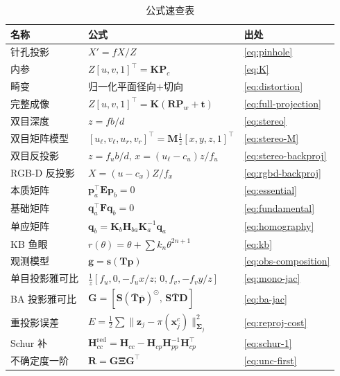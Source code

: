 \begin{table}[H]\centering\small
\caption{公式速查表}
\begin{tabular}{lll}
\toprule
名称 & 公式 & 出处 \\
\midrule
针孔投影 & $X'=fX/Z$ & \cref{eq:pinhole} \\
内参 & $Z[u,v,1]^\top=\mathbf{K}\mathbf{P}_c$ & \cref{eq:K} \\
畸变 & 归一化平面径向$+$切向 & \cref{eq:distortion} \\
完整成像 & $Z[u,v,1]^\top=\mathbf{K}(\mathbf{R}\mathbf{P}_w+\mathbf{t})$ & \cref{eq:full-projection} \\
双目深度 & $z=fb/d$ & \cref{eq:stereo} \\
双目矩阵模型 & $[u_\ell,v_\ell,u_r,v_r]^\top=\mathbf{M}\tfrac1z[x,y,z,1]^\top$ & \cref{eq:stereo-M} \\
双目反投影 & $z=f_ub/d,\,x=(u_\ell-c_u)z/f_u$ & \cref{eq:stereo-backproj} \\
RGB-D 反投影 & $X=(u-c_x)Z/f_x$ & \cref{eq:rgbd-backproj} \\
本质矩阵 & $\mathbf{p}_a^\top\mathbf{E}\mathbf{p}_b=0$ & \cref{eq:essential} \\
基础矩阵 & $\mathbf{q}_a^\top\mathbf{F}\mathbf{q}_b=0$ & \cref{eq:fundamental} \\
单应矩阵 & $\mathbf{q}_b=\mathbf{K}_b\mathbf{H}_{ba}\mathbf{K}_a^{-1}\mathbf{q}_a$ & \cref{eq:homography} \\
KB 鱼眼 & $r(\theta)=\theta+\sum k_n\theta^{2n+1}$ & \cref{eq:kb} \\
观测模型 & $\mathbf{g}=\mathbf{s}(\mathbf{T}\mathbf{p})$ & \cref{eq:obs-composition} \\
单目投影雅可比 & $\tfrac1z[f_u,0,-f_ux/z;\,0,f_v,-f_vy/z]$ & \cref{eq:mono-jac} \\
BA 投影雅可比 & $\mathbf{G}=[\mathbf{S}(\bar{\mathbf{T}}\bar{\mathbf{p}})^\odot,\,\mathbf{S}\bar{\mathbf{T}}\mathbf{D}]$ & \cref{eq:ba-jac} \\
重投影误差 & $E=\tfrac12\sum\|\mathbf{z}_j-\pi(\mathbf{x}_j^c)\|_{\boldsymbol\Sigma_j}^2$ & \cref{eq:reproj-cost} \\
Schur 补 & $\mathbf{H}_{cc}^{\text{red}}=\mathbf{H}_{cc}-\mathbf{H}_{cp}\mathbf{H}_{pp}^{-1}\mathbf{H}_{cp}^\top$ & \cref{eq:schur-1} \\
不确定度一阶 & $\mathbf{R}=\mathbf{G}\boldsymbol\Xi\mathbf{G}^\top$ & \cref{eq:unc-first} \\
\bottomrule
\end{tabular}
\end{table}

